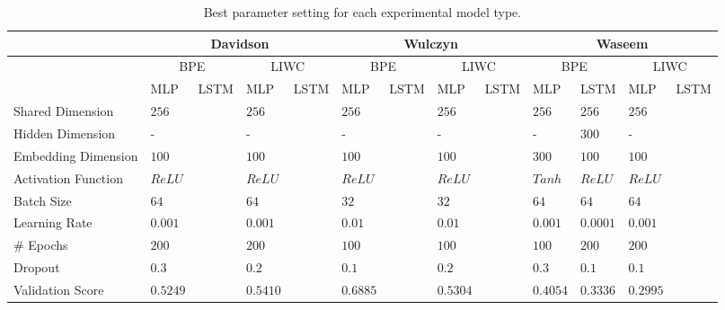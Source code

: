 \begin{landscape}
\begin{table}[]
\centering
\begin{tabular}{lllll|llll|llll}
                    & \multicolumn{4}{c|}{Davidson}   & \multicolumn{4}{c|}{Wulczyn}  & \multicolumn{4}{c}{Waseem}          \\ \hline
                    & \multicolumn{2}{c}{BPE} & \multicolumn{2}{c|}{LIWC} &  \multicolumn{2}{c}{BPE} & \multicolumn{2}{c|}{LIWC} &  \multicolumn{2}{c}{BPE} &  \multicolumn{2}{c}{LIWC} \\
                    & MLP       & LSTM & MLP      & LSTM & MLP      & LSTM & MLP      & LSTM & MLP      & LSTM     & MLP      & LSTM \\
Shared Dimension    & $256$     &      & $256$    &      & $256$    &      & $256$    &      & $256$    & $256$    & $256$    &      \\
Hidden Dimension    & -         &      & -        &      & -        &      & -        &      & -        & $300$    & -        &      \\
Embedding Dimension & $100$     &      & $100$    &      & $100$    &      & $100$    &      & $300$    & $100$    & $100$    &      \\
Activation Function & $ReLU$    &      & $ReLU$   &      & $ReLU$   &      & $ReLU$   &      & $Tanh$   & $ReLU$   & $ReLU$   &      \\
Batch Size          & $64$      &      & $64$     &      & $32$     &      & $32$     &      & $64$     & $64$     & $64$     &      \\
Learning Rate       & $0.001$   &      & $0.001$  &      & $0.01$   &      & $0.01$   &      & $0.001$  & $0.0001$ & $0.001$  &      \\
\# Epochs           & $200$     &      & $200$    &      & $100$    &      & $100$    &      & $100$    & $200$    & $200$    &      \\
Dropout             & $0.3$     &      & $0.2$    &      & $0.1$    &      & $0.2$    &      & $0.3$    & $0.1$    & $0.1$    &      \\
Validation Score    & $0.5249$  &      & $0.5410$ &      & $0.6885$ &      & $0.5304$ &      & $0.4054$ & $0.3336$ & $0.2995$ &
\end{tabular}
\caption{Best parameter setting for each experimental model type.}
\label{tab:mtl_exp_model_parameters}
\end{table}
\end{landscape}

